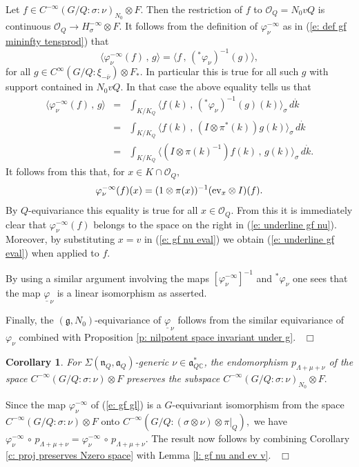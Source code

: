 \documentclass[12pt,a4paper]{article}
\newtheorem{Cor}[Thm]{Corollary}
\newenvironment{cor}[0]{\begin{Cor}\noindent}%
{\end{Cor}}
\def\proof{\par\noindent{\it Proof.}{\ }{\ }}
\def\qed{~\hfill\hbox{$\Box$}\medbreak}
\def\msy#1{{\mathbb #1}}
\def\C{{\msy C}}
\def\gf{\varphi}
\def\gs{\sigma}
\def\gS{\Sigma}
\def\got#1{\mathfrak #1}
\def\fa{{\got a}}
\def\fg{{\got g}}
\def\fn{{\got n}}
\def\to{\rightarrow}
\def\inp#1#2{\langle#1\,,\,#2\rangle}
\def\after{\,{\scriptstyle\circ}\,}
\def\iC{{\scriptscriptstyle \C}}
\def\cO{{\mathcal O}}
\numberwithin{Thm}{section}
\numberwithin{equation}{section}
\def\ev{{\rm ev}}
\def\gL{\Lambda}
\numberwithin{equation}{section}
\def\gL{\Lambda}
\def\faQdc{\fa_{Q\iC}^*}
\begin{document}
Let $f \in C^{-\infty}(G/Q:\gs:\nu)_{N_0} \otimes F.$ Then the restriction of $f$ to $\cO_Q =N_0 v Q$ 
is continuous $\cO_Q \to H_{\gs}^{-\infty} \otimes F.$ It follows from the definition 
of $\gf_\nu^{-\infty}$ as in (\ref{e: def gf mininfty tensprod}) that 
$$ 
\inp{\gf_\nu^{-\infty}(f) }{g} = \inp{f}{({}^*\gf_\nu)^{-1}(g)},
$$ 
for all $g \in C^\infty(G/Q: \xi_{-\bar\nu}) \otimes F_*.$
In particular this is true for all such $g$ with support contained in $N_0 v Q.$ 
In that case  the above equality tells us that
\begin{eqnarray*}
\inp{\gf_\nu^{-\infty}(f) }{g} &= &\int_{K/K_Q} \inp{f(k)}{({}^*\gf_\nu)^{-1}(g)(k)}_\gs \, d\dot{k}\\
&=&\int_{K/K_Q} \inp{f(k)}{(I \otimes \pi^*(k))g(k)} _\gs \,d\dot{k}\\
&=& \int_{K/K_Q} \inp{(I \otimes \pi(k)^{-1})f(k)}{g(k)}_\gs\,  d \dot{k}.
\end{eqnarray*}
It follows from this that, for $x \in K \cap \cO_Q,$ 
\begin{equation}
\label{e: gf nu eval}
\gf_\nu^{-\infty}(f)(x) = (1 \otimes \pi(x))^{-1} (\ev_x \otimes I)(f).
\end{equation}
By $Q$-equivariance this equality is true for all $x \in \cO_Q.$ 
From this it is immediately clear that $\gf_\nu^{-\infty}(f)$ belongs to the space on the right in 
(\ref{e: underline gf nu}). Moreover, by substituting $x = v$ in (\ref{e: gf nu eval}) 
we obtain (\ref{e: underline gf eval}) when applied to $f.$ 

By using a similar argument involving the maps $[\gf_\nu^{-\infty}]^{-1}$ and 
${}^*\gf_\nu$ one sees that the map $\underline \gf_\nu$ is a linear isomorphism as asserted.

Finally, the $(\fg, N_0)$-equivariance of $\underline \gf_\nu$ follows from the similar 
equivariance of $\gf_\nu$ combined with Proposition \ref{p: nilpotent space invariant under g}.
\qed 


\begin{cor}
\label{c: proj preserves Nzero space two} 
For $\gS(\fn_Q,\fa_Q)$-generic $\nu \in \faQdc$, the endomorphism $p_{\gL + \mu + \nu}$ of 
the space 
 $C^{-\infty}(G/Q: \gs: \nu) \otimes F$ preserves the subspace 
 $C^{-\infty}(G/Q:  \gs: \nu)_{N_0}\otimes F.$ 
\end{cor}

\proof 
Since the map $\gf_\nu^{-\infty}$ of (\ref{e: gf gl}) is a $G$-equivariant isomorphism 
from the space $C^{-\infty}(G/Q: \gs : \nu) \otimes F$ onto $C^{-\infty}(G/Q : (\gs \otimes \nu)\otimes \pi|_Q),$
we have  $\gf_\nu^{-\infty} \after p_{\gL + \mu + \nu} = \gf_\nu^{-\infty} \after p_{\gL + \mu + \nu}.$ 
The result now follows by  combining Corollary \ref{c: proj preserves Nzero space}
with  Lemma \ref{l: gf nu and ev v}.
\qed
\end{document}
